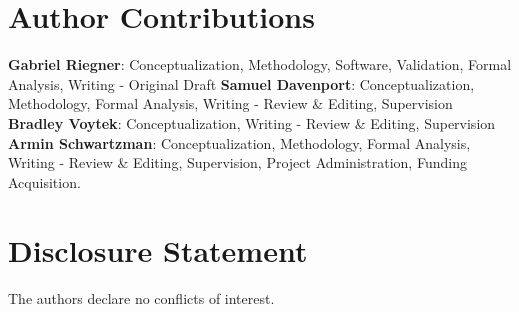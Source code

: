 \documentclass[9pt]{article}
\begin{document}
\section*{Author Contributions}
\textbf{Gabriel Riegner}: Conceptualization, Methodology, Software, Validation, Formal Analysis, Writing - Original Draft
\textbf{Samuel Davenport}: Conceptualization, Methodology, Formal Analysis, Writing - Review \& Editing, Supervision
\textbf{Bradley Voytek}: Conceptualization, Writing - Review \& Editing, Supervision
\textbf{Armin Schwartzman}: Conceptualization, Methodology, Formal Analysis, Writing - Review \& Editing, Supervision, Project Administration, Funding Acquisition.

\section*{Disclosure Statement}
The authors declare no conflicts of interest.

\bigskip

\end{document}
